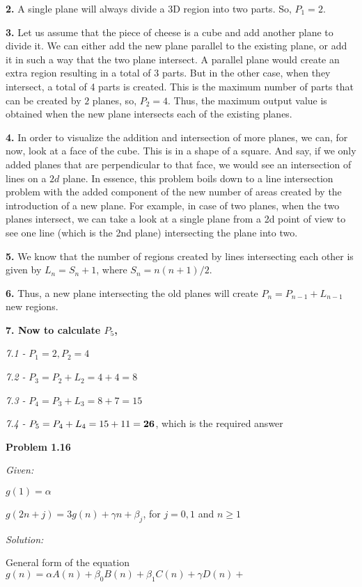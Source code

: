 \documentclass[12pt]{article}
\begin{document}
{\bf 2. } A single plane will always divide a 3D region into two parts. So, $P_1 = 2$.

{\bf 3. } Let us assume that the piece of cheese is a cube and add another plane to divide it. We can either add the new plane parallel to the existing plane, or add it in such a way that the two plane intersect. A parallel plane would create an extra region resulting in a total of 3 parts. But in the other case, when they intersect, a total of 4 parts is created. This is the maximum number of parts that can be created by $2$ planes, so, $P_2 = 4$. Thus, the maximum output value is obtained when the new plane intersects each of the existing planes.

{\bf 4. } In order to visualize the addition and intersection of more planes, we can, for now, look at a face of the cube. This is in a shape of a square. And say, if we only added planes that are perpendicular to that face, we would see an intersection of lines on a $2d$ plane. In essence, this problem boils down to a line intersection problem with the added component of the new number of areas created by the introduction of a new plane. For example, in case of two planes, when the two planes intersect, we can take a look at a single plane from a 2d point of view to see one line (which is the 2nd plane) intersecting the plane into two.

{\bf 5.} We know that the number of regions created by lines intersecting each other is given by $L_n = S_n + 1$, where $S_n = n(n+1)/2$.

{\bf 6.} Thus, a new plane intersecting the old planes will create $P_n = P_{n-1} + L_{n-1}$ new regions.

{\bf 7. Now to calculate $P_5$,}

\textit {7.1 -} $P_1 = 2, P_2 = 4$

\textit {7.2 -} $P_3 = P_2 + L_2 = 4 + 4 = 8$

\textit {7.3 -} $P_4 = P_3 + L_3 = 8 + 7 = 15$

\textit {7.4 -} $P_5 = P_4 + L_4 = 15 + 11 = {\bf 26}$, which is the required answer

\noindent
{\bf Problem 1.16}

\textit {Given:}

$g(1) = \alpha$

$g(2n+j) = 3g(n)+\gamma n+\beta _j$, for $j=0,1$ and $n\geq 1$

\textit {Solution:}

General form of the equation $g(n) = \alpha A(n) + \beta _0 B(n) + \beta _1 C(n) + \gamma D(n) +$
\end{document}
